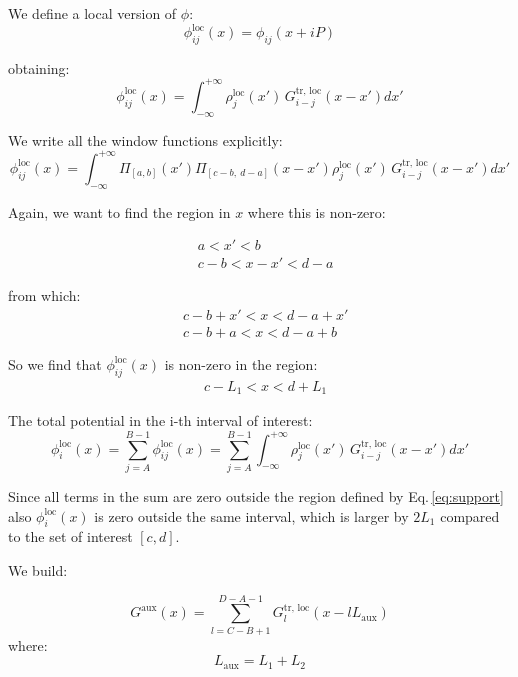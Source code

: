 We define a local version of $\phi$:
\begin{equation}
\phi_{ij}^\text{loc}(x) = \phi_{ij}(x+iP)
\end{equation}

obtaining:
\begin{equation}
\phi_{ij}^\text{loc}(x) = \int_{-\infty}^{+\infty} 
\rho^\text{loc}_j(x')\,G^\text{tr, loc}_{i-j}(x-x') dx'
\end{equation}

We write all the window functions explicitly:
\begin{equation}
\phi_{ij}^\text{loc}(x) = \int_{-\infty}^{+\infty}
\Pi_{[a,b]}(x')
\Pi_{[c-b,~d-a]}(x-x')
\rho^\text{loc}_j(x')\,G^\text{tr, loc}_{i-j}(x-x') dx'
\end{equation}

Again, we want to find the region in $x$ where this is non-zero:

\begin{align}
&a<x'<b\\
&c-b< x-x'<d-a
\end{align}

from which:
\begin{align}
&c-b+x'< x<d-a+x'\\
&c-b+a< x<d-a+b
\end{align}

So we find that $\phi_{ij}^\text{loc}(x)$ is non-zero in the region:
\begin{align}
&c-L_1< x<d+L_1
\label{eq:support}
\end{align}


The total potential in the i-th interval of interest:
\begin{equation}
\phi_{i}^\text{loc}(x)
=\sum_{j=A}^{B-1} \phi_{ij}^\text{loc}(x) = \sum_{j=A}^{B-1}\int_{-\infty}^{+\infty}
\rho^\text{loc}_j(x')\,G^\text{tr, loc}_{i-j}(x-x') dx'
\label{eq:phi_i_loc}
\end{equation}

Since all terms in the sum are zero outside the region defined by Eq.\,\ref{eq:support} also $\phi_{i}^\text{loc}(x)$ is zero outside the same interval, which is larger by $2L_1$ compared to the set of interest $[c, d]$.

We build:

\begin{equation}
G^\text{aux} (x)= \sum_{l=C-B+1}^{D-A-1}
G^\text{tr, loc}_{l}(x-l L_\text{aux})
\label{eq:def_gaux}
\end{equation}
where:
\begin{equation}
L_\text{aux} = L_1 + L_2
\end{equation}

